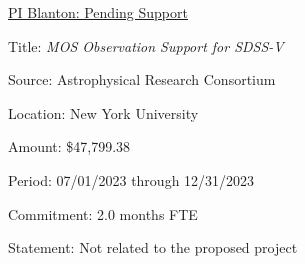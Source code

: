 \documentclass[12pt, preprint]{hacked-aastex}
\begin{document}
\noindent \underline{PI Blanton: Pending Support}

\begin{itemize*}
\item[]{Title: {\em MOS Observation Support for SDSS-V}}
\item[]{Source: Astrophysical Research Consortium}
\item[]{Location: New York University}
\item[]{Amount: \$47,799.38}
\item[]{Period: 07/01/2023 through 12/31/2023}
\item[]{Commitment: 2.0 months FTE}
\item[]{Statement: Not related to the proposed project}
\end{itemize*}


\end{document}
